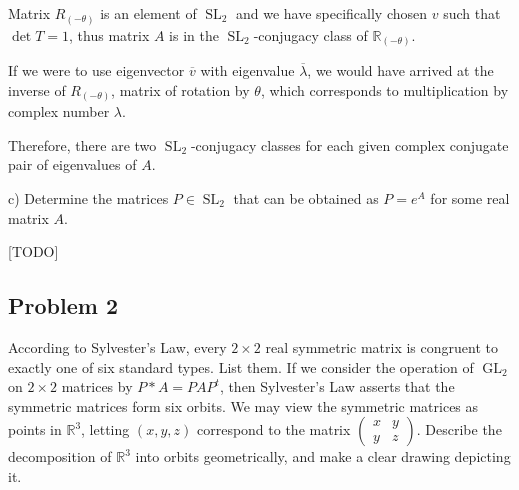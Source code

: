 \documentclass{article}
\theoremstyle{definition}
\newcommand{\R}{\mathbb{R}}
\newcommand{\GL}{\operatorname{GL}}
\newcommand{\SL}{\operatorname{SL}}
\begin{document}
Matrix $R_{(-\theta)}$ is an element of $\SL_2$ and we have specifically chosen $v$ such that $\det T = 1$, thus matrix $A$ is in the $\SL_2$-conjugacy class of $\R_{(-\theta)}$.

If we were to use eigenvector $\overline{v}$ with eigenvalue $\overline{\lambda}$, we would have arrived at the inverse of $R_{(-\theta)}$, matrix of rotation by $\theta$, which corresponds to multiplication by complex number $\lambda$.

Therefore, there are two $\SL_2$-conjugacy classes for each given complex conjugate pair of eigenvalues of $A$. 


\begin{tcolorbox}
c) Determine the matrices $P \in \SL_2$ that can be obtained as $P = e^A$ for some real matrix $A$.
\end{tcolorbox}

[TODO]


\subsection*{Problem 2}

\begin{tcolorbox}
According to Sylvester's Law, every $2 \times 2$ real symmetric matrix is congruent to exactly one of six standard types.
List them.
If we consider the operation of $\GL_2$ on $2 \times 2$ matrices by $P * A = PAP^t$, then Sylvester's Law asserts that the symmetric matrices form six orbits.
We may view the symmetric matrices as points in $\R^3$, letting $(x,y,z)$ correspond to the matrix
$
\begin{pmatrix}
    x & y \\
    y & z
\end{pmatrix}
$.
Describe the decomposition of $\R^3$ into orbits geometrically, and make a clear drawing depicting it.
\end{tcolorbox}
\end{document}

